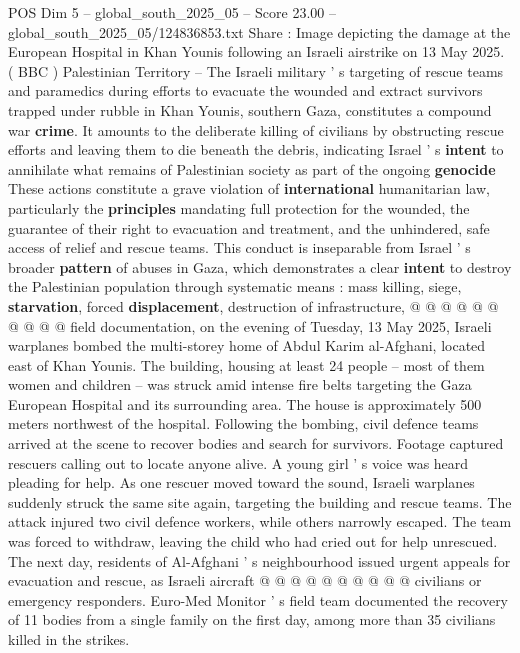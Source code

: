 \begin{textsample}{POS Dim 5 – global\_south\_2025\_05 – Score 23.00 – global\_south\_2025\_05/124836853.txt}  \label{ex:f5_pos_111}
Share : Image depicting the damage at the European Hospital in Khan Younis following an Israeli airstrike on 13 May 2025. ( BBC ) Palestinian Territory -- The Israeli military ' s targeting of rescue teams and paramedics during efforts to evacuate the wounded and extract survivors trapped under rubble in Khan Younis, southern Gaza, constitutes a compound war \textbf{crime}.
It amounts to the deliberate killing of civilians by obstructing rescue efforts and leaving them to die beneath the debris, indicating Israel ' s \textbf{intent} to annihilate what remains of Palestinian society as part of the ongoing \textbf{genocide} These actions constitute a grave violation of \textbf{international} humanitarian law, particularly the \textbf{principles} mandating full protection for the wounded, the guarantee of their right to evacuation and treatment, and the unhindered, safe access of relief and rescue teams.
This conduct is inseparable from Israel ' s broader \textbf{pattern} of abuses in Gaza, which demonstrates a clear \textbf{intent} to destroy the Palestinian population through systematic means : mass killing, siege, \textbf{starvation}, forced \textbf{displacement}, destruction of infrastructure, @ @ @ @ @ @ @ @ @ @ field documentation, on the evening of Tuesday, 13 May 2025, Israeli warplanes bombed the multi-storey home of Abdul Karim al-Afghani, located east of Khan Younis.
The building, housing at least 24 people -- most of them women and children -- was struck amid intense fire belts targeting the Gaza European Hospital and its surrounding area.
The house is approximately 500 meters northwest of the hospital.
Following the bombing, civil defence teams arrived at the scene to recover bodies and search for survivors.
Footage captured rescuers calling out to locate anyone alive.
A young girl ' s voice was heard pleading for help.
As one rescuer moved toward the sound, Israeli warplanes suddenly struck the same site again, targeting the building and rescue teams.
The attack injured two civil defence workers, while others narrowly escaped.
The team was forced to withdraw, leaving the child who had cried out for help unrescued.
The next day, residents of Al-Afghani ' s neighbourhood issued urgent appeals for evacuation and rescue, as Israeli aircraft @ @ @ @ @ @ @ @ @ @ civilians or emergency responders.
Euro-Med Monitor ' s field team documented the recovery of 11 bodies from a single family on the first day, among more than 35 civilians killed in the strikes.

\end{textsample}

